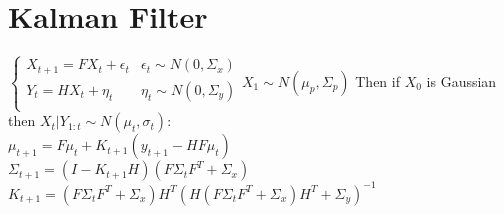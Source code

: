 \section{Kalman Filter}
\(
\begin{cases}
    X_{t+1} = FX_t + \epsilon_t & \epsilon_t\sim N(0,\Sigma_x)\\
    Y_t=HX_t+\eta_t & \eta_t \sim N(0,\Sigma_y)\\
\end{cases} {X_1\sim N(\mu_p, \Sigma_p)}
\)
Then if $X_0$ is Gaussian then $X_{t}\vert Y_{1:t} \sim N(\mu_t, \sigma_t)$:\\
$\mu_{t+1} =F\mu_t+K_{t+1}(y_{t+1}-HF\mu_t)$\\
$\Sigma_{t+1}=(I-K_{t+1}H)(F\Sigma_tF^T+\Sigma_x)$\\
$K_{t+1} = ${\scriptsize $(F\Sigma_tF^T +\Sigma_x)H^T{(H(F\Sigma_tF^T+\Sigma_x)H^T+\Sigma_y)}^{-1}$}

